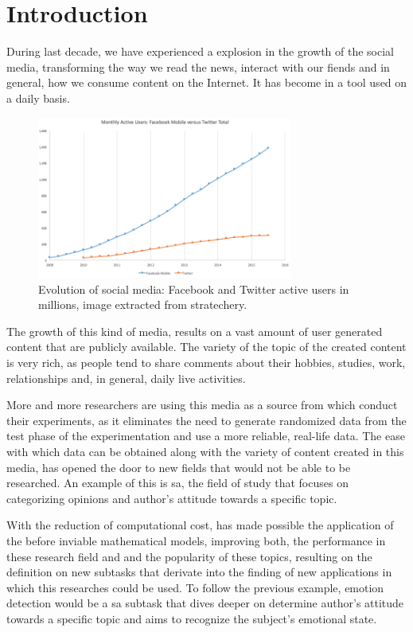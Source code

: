\chapter{Introduction}
\label{chapter_1}

During last decade, we have experienced a explosion in the growth of the social media, transforming the way we read the news, interact with our fiends and in general, how we consume content on the Internet. It has become in a tool used on a daily basis.

\begin{figure}[!htp]
  \center
  \includegraphics[width=0.75\textwidth]{figures/facebook_twitter_users.png}
  \caption{Evolution of social media: Facebook and Twitter active users in millions, image extracted from stratechery.}
  \label{fig:social media evolution}
\end{figure}

The growth of this kind of media, results on a vast amount of user generated content that are publicly available. The variety of the topic of the created content is very rich, as people tend to share comments about their hobbies, studies, work, relationships and, in general, daily live activities.

More and more researchers are using this media as a source from which conduct their experiments, as it eliminates the need to generate randomized data from the test phase of the experimentation and use a more reliable, real-life data. The ease with which data can be obtained along with the variety of content created in this media, has opened the door to new fields that would not be able to be researched. An example of this is \acrlong{sa}, the field of study that focuses on categorizing opinions and author's attitude towards a specific topic.

With the reduction of computational cost, has made possible the application of the before inviable mathematical models, improving both, the performance in these research field and and the popularity of these topics, resulting on the definition on new subtasks that derivate into the finding of new applications in which this researches could be used. To follow the previous example, emotion detection would be a \acrlong{sa} subtask that dives deeper on determine author's attitude towards a specific topic and aims to recognize the subject's emotional state.

